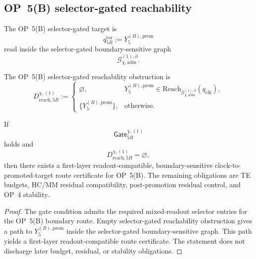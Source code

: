\subsection{OP~5(B) selector-gated reachability}
\label{subsec:v410r23-op5b-selector-gated-reachability}

\begin{definition}
\label{def:v410r23-op5b-selector-gated-target}
The OP~5(B) selector-gated target is
\[
 q_{5B}^{\mathrm{tar}}
 :=
 Y_5^{(B),\mathrm{prom}}
\]
read inside the selector-gated boundary-sensitive graph
\[
 \mathcal G_{\chi,\mathrm{adm}}^{(1),\partial}.
\]
\end{definition}

\begin{definition}
\label{def:v410r23-op5b-selector-gated-reachability-obstruction}
The OP~5(B) selector-gated reachability obstruction is
\[
 D_{\mathrm{reach},5B}^{\chi,(1)}
 :=
 \begin{cases}
 \varnothing,
 &Y_5^{(B),\mathrm{prom}}\in
 \mathrm{Reach}_{\mathcal G_{\chi,\mathrm{adm}}^{(1),\partial}}(q_{\mathrm{clk}}),\\
 \{Y_5^{(B),\mathrm{prom}}\},
 &\text{otherwise.}
 \end{cases}
\]
\end{definition}

\begin{proposition}
\label{prop:v410r23-op5b-first-selector-gated-reachability-pass}
If
\[
 \mathsf{Gate}_{5B}^{\chi,(1)}
\]
holds and
\[
 D_{\mathrm{reach},5B}^{\chi,(1)}=\varnothing,
\]
then there exists a first-layer readout-compatible, boundary-sensitive
clock-to-promoted-target route certificate for OP~5(B). The remaining
obligations are TE budgets, HC/MM residual compatibility, post-promotion
residual control, and OP~4 stability.
\end{proposition}

\begin{proof}
The gate condition admits the required mixed-readout selector entries for the
OP~5(B) boundary route. Empty selector-gated reachability obstruction gives a
path to \(Y_5^{(B),\mathrm{prom}}\) inside the selector-gated
boundary-sensitive graph. This path yields a first-layer readout-compatible
route certificate. The statement does not discharge later budget, residual, or
stability obligations.
\end{proof}

